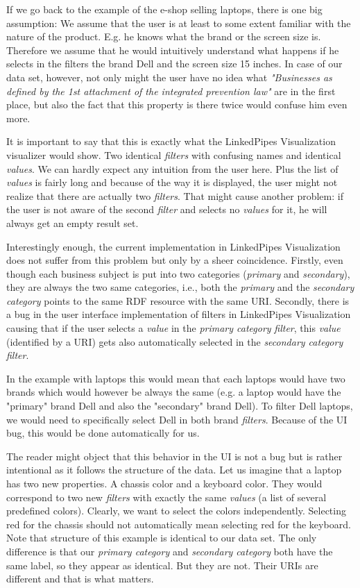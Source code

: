 If we go back to the example of the e-shop selling laptops, there is one big assumption: We assume that the user is at least to some extent familiar with the nature of the product. E.g. he knows what the brand or the screen size is. Therefore we assume that he would intuitively understand what happens if he selects in the filters the brand Dell and the screen size 15 inches. In case of our data set, however, not only might the user have no idea what \textit{"Businesses as defined by the 1st attachment of the integrated prevention law"} are in the first place, but also the fact that this property is there twice would confuse him even more. 

It is important to say that this is exactly what the LinkedPipes Visualization visualizer would show. Two identical \emph{filters} with confusing names and identical \emph{values}. We can hardly expect any intuition from the user here. Plus the list of \emph{values} is fairly long and because of the way it is displayed, the user might not realize that there are actually two \emph{filters}. That might cause another problem: if the user is not aware of the second \emph{filter} and selects no \emph{values} for it, he will always get an empty result set.

Interestingly enough, the current implementation in LinkedPipes Visualization does not suffer from this problem but only by a sheer coincidence. Firstly, even though each business subject is put into two categories (\emph{primary} and \emph{secondary}), they are always the two same categories, i.e., both the \emph{primary} and the \emph{secondary category} points to the same RDF resource with the same URI. Secondly, there is a bug in the  user interface implementation of filters in LinkedPipes Visualization causing that if the user selects a \emph{value} in the \emph{primary category} \emph{filter}, this \emph{value} (identified by a URI) gets also automatically selected in the \emph{secondary category} \emph{filter}.

In the example with laptops this would mean that each laptops would have two brands which would however be always the same (e.g. a laptop would have the "primary" brand Dell and also the "secondary" brand Dell). To filter Dell laptops, we would need to specifically select Dell in both brand \emph{filters}. Because of the UI bug, this would be done automatically for us.

The reader might object that this behavior in the UI is not a bug but is rather intentional as it follows the structure of the data. Let us imagine that a laptop has two new properties. A chassis color and a keyboard color. They would correspond to two new \emph{filters} with exactly the same \emph{values} (a list of several predefined colors). Clearly, we want to select the colors independently. Selecting red for the chassis should not automatically mean selecting red for the keyboard. Note that structure of this example is identical to our data set. The only difference is that our \emph{primary category} and \emph{secondary category} both have the same label, so they appear as identical. But they are not. Their URIs are different and that is what matters.

